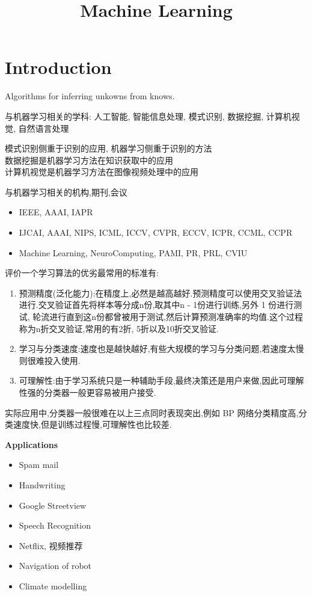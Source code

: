 \documentclass{article}
\begin{document}
\title{Machine Learning}
\author{}
\maketitle
\tableofcontents
\newpage
\section{Introduction}
Algorithms for inferring unkowns from knows.

与机器学习相关的学科: 人工智能, 智能信息处理, 模式识别, 数据挖掘, 计算机视觉, 自然语言处理

模式识别侧重于识别的应用, 机器学习侧重于识别的方法\\
数据挖掘是机器学习方法在知识获取中的应用\\
计算机视觉是机器学习方法在图像视频处理中的应用

与机器学习相关的机构,期刊,会议
\begin{itemize}
\item IEEE, AAAI, IAPR
\item IJCAI, AAAI, NIPS, ICML, ICCV, CVPR, ECCV, ICPR, CCML, CCPR
\item Machine Learning, NeuroComputing, PAMI, PR, PRL, CVIU
\end{itemize}

评价一个学习算法的优劣最常用的标准有:
\begin{enumerate}
\item 预测精度(泛化能力):在精度上,必然是越高越好.预测精度可以使用交叉验证法进行.交叉验证首先将样本等分成n份,取其中n - 1份进行训练,另外 1 份进行测试,
轮流进行直到这n份都曾被用于测试,然后计算预测准确率的均值.这个过程称为n折交叉验证,常用的有2折, 5折以及10折交叉验证.
\item 学习与分类速度:速度也是越快越好,有些大规模的学习与分类问题,若速度太慢则很难投入使用.
\item 可理解性:由于学习系统只是一种辅助手段,最终决策还是用户来做,因此可理解性强的分类器一般更容易被用户接受.
\end{enumerate}
实际应用中,分类器一般很难在以上三点同时表现突出,例如 BP 网络分类精度高,分类速度快,但是训练过程慢,可理解性也比较差.

\textbf{Applications}
\begin{itemize}
\item Spam mail
\item Handwriting
\item Google Streetview
\item Speech Recognition
\item Netflix, 视频推荐
\item Navigation of robot
\item Climate modelling
\end{itemize}
\end{document}
